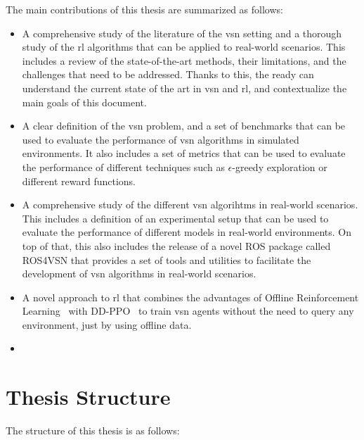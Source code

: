 The main contributions of this thesis are summarized as follows:
\begin{itemize}
    \item A comprehensive study of the literature of the \acrshort{vsn} setting and a thorough study of the \acrshort{rl} algorithms that can be applied to real-world scenarios.
    This includes a review of the state-of-the-art methods, their limitations, and the challenges that need to be addressed.
    Thanks to this, the ready can understand the current state of the art in \acrshort{vsn} and \acrshort{rl}, and contextualize the main goals of this document.
    \item A clear definition of the \acrshort{vsn} problem, and a set of benchmarks that can be used to evaluate the performance of \acrshort{vsn} algorithms in simulated environments.
    It also includes a set of metrics that can be used to evaluate the performance of different techniques such as $\epsilon$-greedy exploration or different reward functions.
    \item A comprehensive study of the different \acrshort{vsn} algorihtms in real-world scenarios.
    This includes a definition of an experimental setup that can be used to evaluate the performance of different models in real-world environments.
    On top of that, this also includes the release of a novel ROS package called ROS4VSN that provides a set of tools and utilities to facilitate the development of \acrshort{vsn} algorithms in real-world scenarios.
    \item A novel approach to \acrshort{rl} that combines the advantages of Offline Reinforcement Learning~\cite{levine2020} with DD-PPO~\cite{Wijmans2019DDPPOLN} to train \acrshort{vsn} agents without the need to query any environment, just by using offline data.
    \item
\end{itemize}

\section{Thesis Structure}\label{sec:thesis-structure}

The structure of this thesis is as follows: